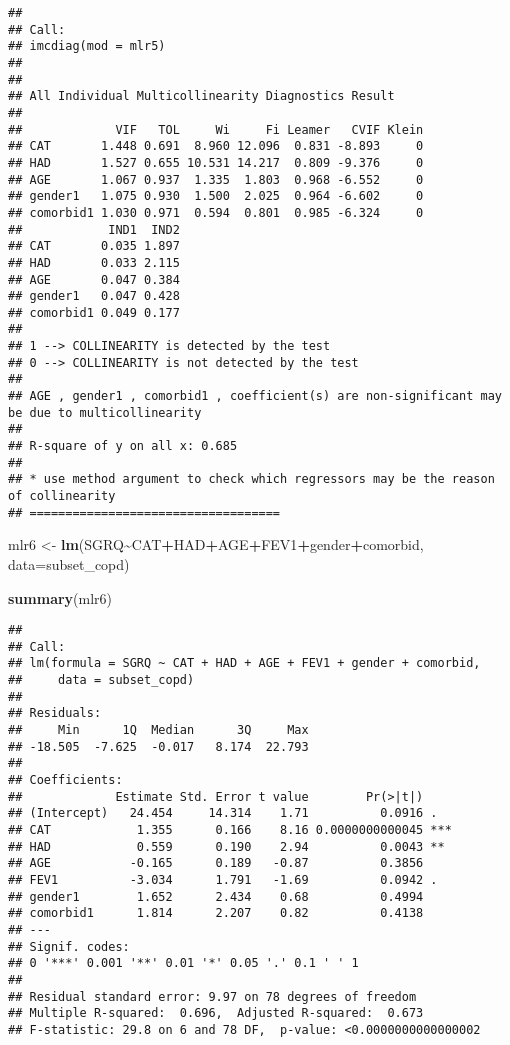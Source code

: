 \documentclass[
]{article}
\newenvironment{Shaded}{\begin{snugshade}}{\end{snugshade}}
\newcommand{\AttributeTok}[1]{\textcolor[rgb]{0.13,0.29,0.53}{#1}}
\newcommand{\FunctionTok}[1]{\textcolor[rgb]{0.13,0.29,0.53}{\textbf{#1}}}
\newcommand{\NormalTok}[1]{#1}
\newcommand{\OtherTok}[1]{\textcolor[rgb]{0.56,0.35,0.01}{#1}}
\newcommand{\SpecialCharTok}[1]{\textcolor[rgb]{0.81,0.36,0.00}{\textbf{#1}}}
\begin{document}
\begin{verbatim}
## 
## Call:
## imcdiag(mod = mlr5)
## 
## 
## All Individual Multicollinearity Diagnostics Result
## 
##             VIF   TOL     Wi     Fi Leamer   CVIF Klein
## CAT       1.448 0.691  8.960 12.096  0.831 -8.893     0
## HAD       1.527 0.655 10.531 14.217  0.809 -9.376     0
## AGE       1.067 0.937  1.335  1.803  0.968 -6.552     0
## gender1   1.075 0.930  1.500  2.025  0.964 -6.602     0
## comorbid1 1.030 0.971  0.594  0.801  0.985 -6.324     0
##            IND1  IND2
## CAT       0.035 1.897
## HAD       0.033 2.115
## AGE       0.047 0.384
## gender1   0.047 0.428
## comorbid1 0.049 0.177
## 
## 1 --> COLLINEARITY is detected by the test 
## 0 --> COLLINEARITY is not detected by the test
## 
## AGE , gender1 , comorbid1 , coefficient(s) are non-significant may be due to multicollinearity
## 
## R-square of y on all x: 0.685 
## 
## * use method argument to check which regressors may be the reason of collinearity
## ===================================
\end{verbatim}

\begin{Shaded}
\begin{Highlighting}[]
\NormalTok{mlr6 }\OtherTok{\textless{}{-}} \FunctionTok{lm}\NormalTok{(SGRQ}\SpecialCharTok{\textasciitilde{}}\NormalTok{CAT}\SpecialCharTok{+}\NormalTok{HAD}\SpecialCharTok{+}\NormalTok{AGE}\SpecialCharTok{+}\NormalTok{FEV1}\SpecialCharTok{+}\NormalTok{gender}\SpecialCharTok{+}\NormalTok{comorbid, }\AttributeTok{data=}\NormalTok{subset\_copd)}
\end{Highlighting}
\end{Shaded}

\begin{Shaded}
\begin{Highlighting}[]
\FunctionTok{summary}\NormalTok{(mlr6)}
\end{Highlighting}
\end{Shaded}

\begin{verbatim}
## 
## Call:
## lm(formula = SGRQ ~ CAT + HAD + AGE + FEV1 + gender + comorbid, 
##     data = subset_copd)
## 
## Residuals:
##     Min      1Q  Median      3Q     Max 
## -18.505  -7.625  -0.017   8.174  22.793 
## 
## Coefficients:
##             Estimate Std. Error t value        Pr(>|t|)    
## (Intercept)   24.454     14.314    1.71          0.0916 .  
## CAT            1.355      0.166    8.16 0.0000000000045 ***
## HAD            0.559      0.190    2.94          0.0043 ** 
## AGE           -0.165      0.189   -0.87          0.3856    
## FEV1          -3.034      1.791   -1.69          0.0942 .  
## gender1        1.652      2.434    0.68          0.4994    
## comorbid1      1.814      2.207    0.82          0.4138    
## ---
## Signif. codes:  
## 0 '***' 0.001 '**' 0.01 '*' 0.05 '.' 0.1 ' ' 1
## 
## Residual standard error: 9.97 on 78 degrees of freedom
## Multiple R-squared:  0.696,  Adjusted R-squared:  0.673 
## F-statistic: 29.8 on 6 and 78 DF,  p-value: <0.0000000000000002
\end{verbatim}
\end{document}
